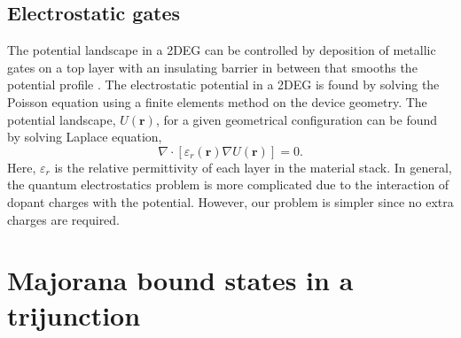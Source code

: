 \subsection{Electrostatic gates}

The potential landscape in a 2DEG can be controlled by deposition of metallic gates on a top layer with an insulating barrier in between that smooths the potential profile \cite{Antipov2018}.
The electrostatic potential in a 2DEG is found by solving the Poisson equation using a finite elements method \cite{Armagnat2019} on the device geometry.
The potential landscape, $U(\mathbf{r})$, for a given geometrical configuration can be found by solving Laplace equation,
\begin{equation}\label{eq: laplace}
\nabla \cdot \left[ \varepsilon_r(\mathbf{r}) \nabla U(\mathbf{r}) \right] = 0.
\end{equation}
Here, $\varepsilon_r$ is the relative permittivity of each layer in the material stack.
In general, the quantum electrostatics problem is more complicated due to the interaction of dopant charges with the potential.
However, our problem is simpler since no extra charges are required.


\section{Majorana bound states in a trijunction}

